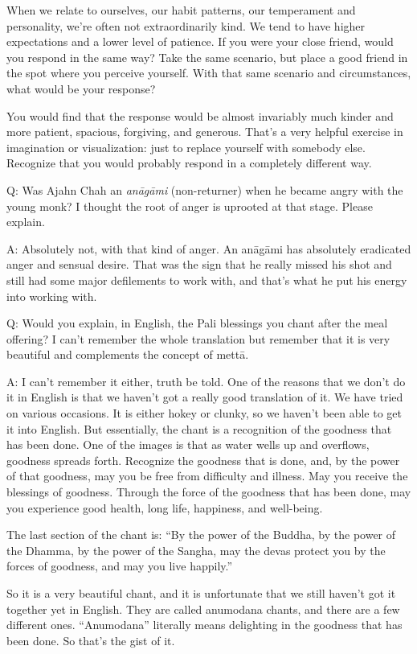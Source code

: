 When we relate to ourselves, our habit patterns, our temperament and
personality, we’re often not extraordinarily kind. We tend to have
higher expectations and a lower level of patience. If you were your
close friend, would you respond in the same way? Take the same scenario,
but place a good friend in the spot where you perceive yourself. With
that same scenario and circumstances, what would be your response?

You would find that the response would be almost invariably much kinder
and more patient, spacious, forgiving, and generous. That’s a very
helpful exercise in imagination or visualization: just to replace
yourself with somebody else. Recognize that you would probably respond
in a completely different way.

\qaspace
Q: Was Ajahn Chah an \emph{anāgāmi} (non-returner) when he became angry
with the young monk? I thought the root of anger is uprooted at that
stage. Please explain.

\qaspace
A: Absolutely not, with that kind of anger. An anāgāmi has absolutely
eradicated anger and sensual desire. That was the sign that he really
missed his shot and still had some major defilements to work with, and
that’s what he put his energy into working with.

\qaspace
Q: Would you explain, in English, the Pali blessings you chant after the
meal offering? I can’t remember the whole translation but remember that
it is very beautiful and complements the concept of mettā.

\qaspace
A: I can’t remember it either, truth be told. One of the reasons that we
don’t do it in English is that we haven’t got a really good translation
of it. We have tried on various occasions. It is either hokey or clunky,
so we haven’t been able to get it into English. But essentially, the
chant is a recognition of the goodness that has been done. One of the
images is that as water wells up and overflows, goodness spreads forth.
Recognize the goodness that is done, and, by the power of that goodness,
may you be free from difficulty and illness. May you receive the
blessings of goodness. Through the force of the goodness that has been
done, may you experience good health, long life, happiness, and
well-being.

The last section of the chant is: “By the power of the Buddha, by the
power of the Dhamma, by the power of the Sangha, may the devas protect
you by the forces of goodness, and may you live happily.”

So it is a very beautiful chant, and it is unfortunate that we still
haven’t got it together yet in English. They are called anumodana
chants, and there are a few different ones. “Anumodana” literally means
delighting in the goodness that has been done. So that’s the gist of it.

